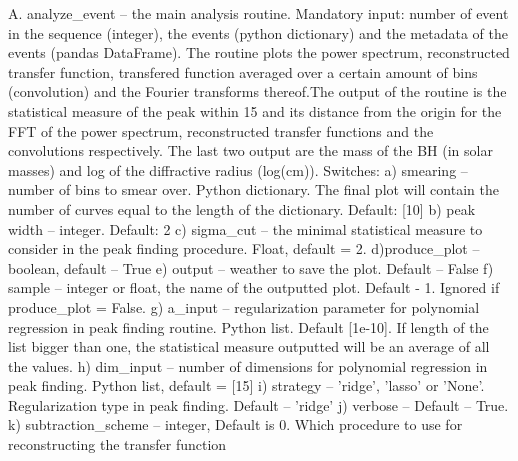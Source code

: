 A. analyze_event -- the main analysis routine. Mandatory input: number of event
in the sequence (integer), the events (python dictionary) and the metadata of the 
events (pandas DataFrame). The routine plots the power spectrum, reconstructed
transfer function, transfered function averaged over a certain amount of bins 
(convolution) and the Fourier transforms thereof.The output of the routine 
is the statistical measure of the peak within 15%
and its distance from the origin for the FFT of the power spectrum, reconstructed 
transfer functions and the convolutions respectively. The last two output are the 
mass of the BH (in solar masses) and log of the diffractive radius (log(cm)).
Switches:
a) smearing -- number of bins to smear over. Python dictionary. The final 
plot will contain the number of curves equal to the length of the dictionary. 
Default: [10]
b) peak width -- integer. Default: 2
c) sigma_cut -- the minimal statistical measure to consider in the peak finding 
procedure. Float, default = 2.
d)produce_plot -- boolean, default -- True
e) output -- weather to save the plot. Default -- False
f) sample -- integer or float, the name of the outputted plot. Default - 1.
Ignored if produce_plot = False. 
g) a_input -- regularization parameter for polynomial regression in peak finding 
routine. Python list. Default [1e-10]. If length of the list bigger than one, 
the statistical measure outputted will be an average of all the values.
h) dim_input -- number of dimensions for polynomial regression in peak finding. 
Python list, default = [15]
i) strategy -- 'ridge', 'lasso' or 'None'. Regularization type in peak finding. 
Default -- 'ridge'
j) verbose -- Default -- True. 
k) subtraction_scheme -- integer, Default is 0. Which procedure to use for 
reconstructing the transfer function  